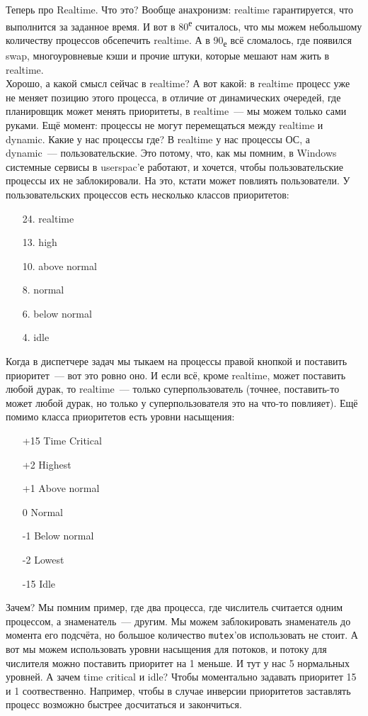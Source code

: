 \documentclass{article}
\begin{document}
    Теперь про Realtime. Что это? Вообще анахронизм: realtime гарантируется, что выполнится за заданное время. И вот в 80\textsuperscript{е} считалось, что мы можем небольшому количеству процессов обсепечить realtime. А в 90\textsubscript{е} всё сломалось, где появился swap, многоуровневые кэши и прочие штуки, которые мешают нам жить в realtime.\\
    Хорошо, а какой смысл сейчас в realtime? А вот какой: в realtime процесс уже не меняет позицию этого процесса, в отличие от динамических очередей, где планировщик может менять приоритеты, в realtime~--- мы можем только сами руками. Ещё момент: процессы не могут перемещаться между realtime и dynamic. Какие у нас процессы где? В realtime у нас процессы ОС, а dynamic~--- пользовательские. Это потому, что, как мы помним, в Windows системные сервисы в userspac'е работают, и хочется, чтобы пользовательские процессы их не заблокировали. На это, кстати может повлиять пользователи. У пользовательских процессов есть несколько классов приоритетов:
    \begin{enumerate}
        \item[24.] realtime
        \item[13.] high
        \item[10.] above normal
        \item[8.] normal
        \item[6.] below normal
        \item[4.] idle
    \end{enumerate}
    Когда в диспетчере задач мы тыкаем на процессы правой кнопкой и поставить приоритет~--- вот это ровно оно. И если всё, кроме realtime, может поставить любой дурак, то realtime~--- только суперпользователь (точнее, поставить-то может любой дурак, но только у суперпользователя это на что-то повлияет). Ещё помимо класса приоритетов есть уровни насыщения:
    \begin{enumerate}
        \item[+15] Time Critical
        \item[+2] Highest
        \item[+1] Above normal
        \item[0] Normal
        \item[-1] Below normal
        \item[-2] Lowest
        \item[-15] Idle
    \end{enumerate}
    Зачем? Мы помним пример, где два процесса, где числитель считается одним процессом, а знаменатель~--- другим. Мы можем заблокировать знаменатель до момента его подсчёта, но большое количество \Verb|mutex|'ов использовать не стоит. А вот мы можем использовать уровни насыщения для потоков, и потоку для числителя можно поставить приоритет на 1 меньше. И тут у нас 5 нормальных уровней. А зачем time critical и idle? Чтобы моментально задавать приоритет 15 и 1 соотвественно. Например, чтобы в случае инверсии приоритетов заставлять процесс возможно быстрее досчитаться и закончиться.\\
\end{document}
